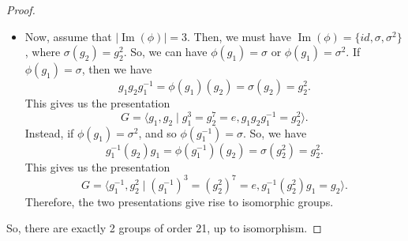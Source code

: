 \documentclass[a4paper, openany]{memoir}
\theoremstyle{definition}
\theoremstyle{plain}
\begin{document}
\begin{proof}
\begin{itemize}
    \item Now, assume that $|\operatorname{Im}(\phi)| = 3$. Then, we must have $\operatorname{Im}(\phi) = \{id, \sigma, \sigma^2\}$, where $\sigma(g_2) = g_2^2$. So, we can have $\phi(g_1) = \sigma$ or $\phi(g_1) = \sigma^2$. If $\phi(g_1) = \sigma$, then we have
    \[g_1g_2g_1^{-1} = \phi(g_1)(g_2) = \sigma(g_2) = g_2^2.\]
    This gives us the presentation
    \[G = \langle g_1, g_2 \mid g_1^3 = g_2^7 = e, g_1g_2g_1^{-1} = g_2^2 \rangle.\]
    Instead, if $\phi(g_1) = \sigma^2$, and so $\phi(g_1^{-1}) = \sigma$. So, we have
    \[g_1^{-1} (g_2) g_1 = \phi(g_1^{-1})(g_2) = \sigma(g_2^2) = g_2^2.\]
    This gives us the presentation
    \[G = \langle g_1^{-1}, g_2^2 \mid (g_1^{-1})^3 = (g_2^2)^7 = e, g_1^{-1} (g_2^2) g_1 = g_2 \rangle.\]
    Therefore, the two presentations give rise to isomorphic groups.
\end{itemize}
So, there are exactly 2 groups of order 21, up to isomorphism.
\end{proof}
\end{document}
